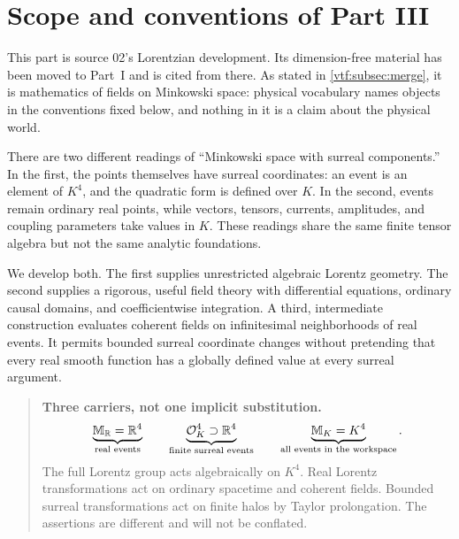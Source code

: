 \documentclass[11pt,letterpaper]{article}
\theoremstyle{definition}
\theoremstyle{remark}
\newenvironment{principle}{\begin{quote}\small}{\end{quote}}
\newcommand{\R}{\mathbb R}\newcommand{\C}{\mathbb C}
\newcommand{\M}{\mathbb M}
\begin{document}
\section{Scope and conventions of Part III}\label{vtf:mink:sec:scope}

This part is source 02's Lorentzian development. Its dimension-free material has
been moved to Part~I and is cited from there. As stated in
\cref{vtf:subsec:merge}, it is mathematics of fields on Minkowski space: physical
vocabulary names objects in the conventions fixed below, and nothing in it is a
claim about the physical world.

There are two different readings of ``Minkowski space with surreal components.'' In the first, the points themselves have surreal coordinates: an event is an element of $K^4$, and the quadratic form is defined over $K$. In the second, events remain ordinary real points, while vectors, tensors, currents, amplitudes, and coupling parameters take values in $K$. These readings share the same finite tensor algebra but not the same analytic foundations.

We develop both. The first supplies unrestricted algebraic Lorentz geometry. The second supplies a rigorous, useful field theory with differential equations, ordinary causal domains, and coefficientwise integration. A third, intermediate construction evaluates coherent fields on infinitesimal neighborhoods of real events. It permits bounded surreal coordinate changes without pretending that every real smooth function has a globally defined value at every surreal argument.

\begin{principle}
\textbf{Three carriers, not one implicit substitution.}
\[
\underbrace{\M_\R=\R^4}_{\text{real events}}
\qquad
\underbrace{\OO_K^4\supset\R^4}_{\text{finite surreal events}}
\qquad
\underbrace{\M_K=K^4}_{\text{all events in the workspace}}.
\]
The full Lorentz group acts algebraically on $K^4$. Real Lorentz transformations act on ordinary spacetime and coherent fields. Bounded surreal transformations act on finite halos by Taylor prolongation. The assertions are different and will not be conflated.
\end{principle}
\end{document}
